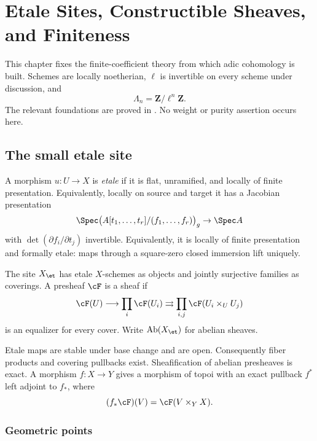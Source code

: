 \chapter{Etale Sites, Constructible Sheaves, and Finiteness}
\label{ch:etale-foundations}

This chapter fixes the finite-coefficient theory from which adic cohomology is
built.  Schemes are locally noetherian, \(\ell\) is invertible on every scheme
under discussion, and
\[
 \Lambda_n=\mathbf Z/\ell^n\mathbf Z.
\]
The relevant foundations are proved in
\cite{SGA4,SGA4half,MilneEtale,FreitagKiehl,ConradEtaleNotes}.  No weight or
purity assertion occurs here.

\section{The small etale site}

\begin{definition}
A morphism \(u:U\to X\) is \emph{etale} if it is flat, unramified, and locally
of finite presentation.  Equivalently, locally on source and target it has a
Jacobian presentation
\[
 \Spec\bigl(A[t_1,\ldots,t_r]/(f_1,\ldots,f_r)\bigr)_g\to\Spec A
\]
with \(\det(\partial f_i/\partial t_j)\) invertible.  Equivalently, it is
locally of finite presentation and formally etale: maps through a square-zero
closed immersion lift uniquely.
\end{definition}

\begin{definition}
\label{def:small-etale-site}
The site \(X_{\et}\) has etale \(X\)-schemes as objects and jointly surjective
families as coverings.  A presheaf \(\cF\) is a sheaf if
\[
 \cF(U)\longrightarrow\prod_i\cF(U_i)
 \rightrightarrows\prod_{i,j}\cF(U_i\times_UU_j)
\]
is an equalizer for every cover.  Write \(\operatorname{Ab}(X_{\et})\) for
abelian sheaves.
\end{definition}

Etale maps are stable under base change and are open.  Consequently fiber
products and covering pullbacks exist.  Sheafification of abelian presheaves
is exact.  A morphism \(f:X\to Y\) gives a morphism of topoi with an exact
pullback \(f^*\) left adjoint to \(f_*\), where
\[
 (f_*\cF)(V)=\cF(V\times_YX).
\]

\subsection{Geometric points}

